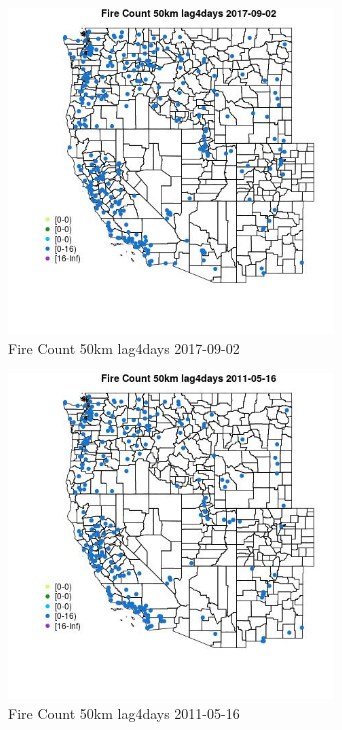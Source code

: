 \begin{figure} 
\centering  
\includegraphics[width=0.77\textwidth]{Code_Outputs/Report_ML_input_PM25_Step4_part_e_de_duplicated_aves_compiled_2019-05-20wNAs_MapObsFire_Count_50km_lag4days2017-09-02.jpg} 
\caption{\label{fig:Report_ML_input_PM25_Step4_part_e_de_duplicated_aves_compiled_2019-05-20wNAsMapObsFire_Count_50km_lag4days2017-09-02}Fire Count 50km lag4days 2017-09-02} 
\end{figure} 
 

\begin{figure} 
\centering  
\includegraphics[width=0.77\textwidth]{Code_Outputs/Report_ML_input_PM25_Step4_part_e_de_duplicated_aves_compiled_2019-05-20wNAs_MapObsFire_Count_50km_lag4days2011-05-16.jpg} 
\caption{\label{fig:Report_ML_input_PM25_Step4_part_e_de_duplicated_aves_compiled_2019-05-20wNAsMapObsFire_Count_50km_lag4days2011-05-16}Fire Count 50km lag4days 2011-05-16} 
\end{figure} 
 

